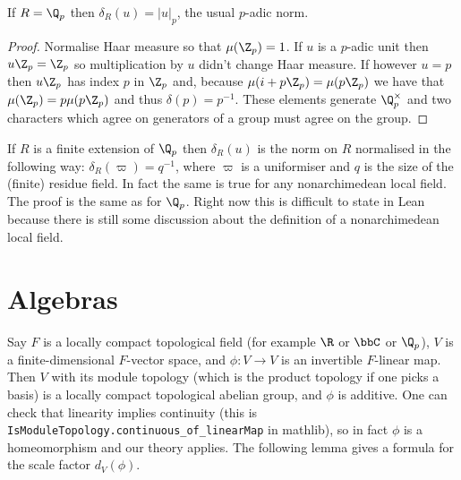 \begin{lemma}
  \label{distribHaarChar_padic}
  \leanok
  If $R=\Q_p$ then $\delta_R(u)=|u|_p$, the usual $p$-adic norm.
\end{lemma}
\begin{proof}
  \leanok
  Normalise Haar measure so that $\mu(\Z_p)=1$.
  If $u$ is a $p$-adic unit then $u\Z_p=\Z_p$ so multiplication by $u$ didn't change
  Haar measure. If however $u=p$ then $u\Z_p$ has index $p$ in $\Z_p$ and, because
  $\mu(i+p\Z_p)=\mu(p\Z_p)$ we have that $\mu(\Z_p)=p\mu(p\Z_p)$ and thus $\delta(p)=p^{-1}$.
  These elements generate $\Q_p^\times$ and two characters which agree on generators
  of a group must agree on the group.
\end{proof}

\begin{remark}
If $R$ is a finite extension of $\Q_p$ then $\delta_R(u)$
is the norm on $R$ normalised in the following way:
$\delta_R(\varpi)=q^{-1}$, where $\varpi$ is a uniformiser
and $q$ is the size of the (finite) residue field. In fact the same is true
for any nonarchimedean local field. The proof is
the same as for $\Q_p$. Right now this is difficult to state in Lean because
there is still some discussion about the definition of a nonarchimedean local field.
\end{remark}

\section{Algebras}

  Say $F$ is a locally compact topological field (for example $\R$ or $\bbC$ or $\Q_p$), $V$
  is a finite-dimensional $F$-vector space, and $\phi:V\to V$ is an invertible $F$-linear map.
  Then $V$ with its module topology (which is the product topology if one picks a basis)
  is a locally compact topological abelian group, and $\phi$ is additive.
  One can check that linearity implies continuity (this is {\tt IsModuleTopology.continuous\_of\_linearMap} in mathlib),
  so in fact $\phi$ is a homeomorphism
  and our theory applies. The following lemma gives a formula for the scale factor $d_V(\phi)$.

